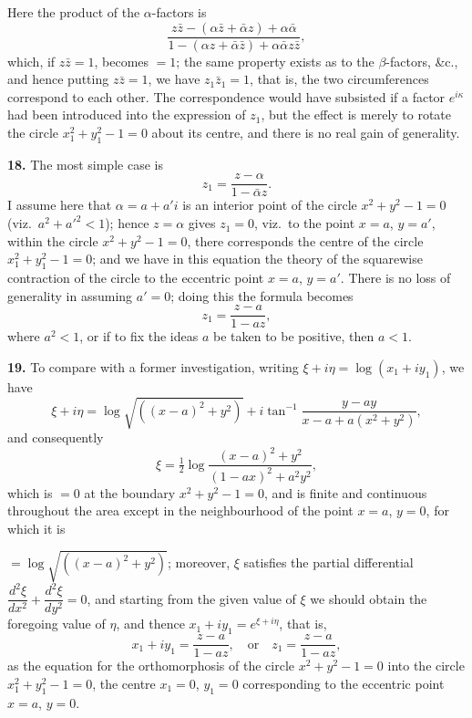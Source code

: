 \documentclass[11pt,a4paper]{article}
\begin{document}
Here the product of the $\alpha$-factors is
\[
\frac{z\bar{z} - (\alpha\bar{z} + \bar{\alpha}z) + \alpha\bar{\alpha}}{1 - (\alpha z + \bar{\alpha}\bar{z}) + \alpha\bar{\alpha} z\bar{z}},
\]
which, if $z\bar{z} = 1$, becomes $= 1$; the same property exists as to the $\beta$-factors, \&c., and hence putting $z\bar{z} = 1$, we have $z_1 \bar{z}_1 = 1$, that is, the two circumferences correspond to each other. The correspondence would have subsisted if a factor $e^{i\kappa}$ had been introduced into the expression of $z_1$, but the effect is merely to rotate the circle $x_1^2 + y_1^2 - 1 = 0$ about its centre, and there is no real gain of generality.

\textbf{18.} The most simple case is
\[
z_1 = \frac{z - \alpha}{1 - \bar{\alpha}z}.
\]
I assume here that $\alpha = a + a'i$ is an interior point of the circle $x^2 + y^2 - 1 = 0$ (viz.\ $a^2 + a'^2 < 1$); hence $z = \alpha$ gives $z_1 = 0$, viz.\ to the point $x = a$, $y = a'$, within the circle $x^2 + y^2 - 1 = 0$, there corresponds the centre of the circle $x_1^2 + y_1^2 - 1 = 0$; and we have in this equation the theory of the squarewise contraction of the circle to the eccentric point $x = a$, $y = a'$. There is no loss of generality in assuming $a' = 0$; doing this the formula becomes
\[
z_1 = \frac{z - a}{1 - az},
\]
where $a^2 < 1$, or if to fix the ideas $a$ be taken to be positive, then $a < 1$.

\textbf{19.} To compare with a former investigation, writing $\xi + i\eta = \log(x_1 + i y_1)$, we have
\[
\xi + i\eta = \log\sqrt{((x - a)^2 + y^2)} + i\tan^{-1}\frac{y - ay}{x - a + a(x^2 + y^2)},
\]
and consequently
\[
\xi = \tfrac{1}{2}\log\frac{(x - a)^2 + y^2}{(1 - ax)^2 + a^2 y^2},
\]
which is $= 0$ at the boundary $x^2 + y^2 - 1 = 0$, and is finite and continuous throughout the area except in the neighbourhood of the point $x = a$, $y = 0$, for which it is

$= \log\sqrt{((x - a)^2 + y^2)}$; moreover, $\xi$ satisfies the partial differential $\dfrac{d^2\xi}{dx^2} + \dfrac{d^2\xi}{dy^2} = 0$, and starting from the given value of $\xi$ we should obtain the foregoing value of $\eta$, and thence $x_1 + i y_1 = e^{\xi + i\eta}$, that is,
\[
x_1 + i y_1 = \frac{z - a}{1 - az}, \quad \text{or} \quad z_1 = \frac{z - a}{1 - az},
\]
as the equation for the orthomorphosis of the circle $x^2 + y^2 - 1 = 0$ into the circle $x_1^2 + y_1^2 - 1 = 0$, the centre $x_1 = 0$, $y_1 = 0$ corresponding to the eccentric point $x = a$, $y = 0$.
\end{document}
